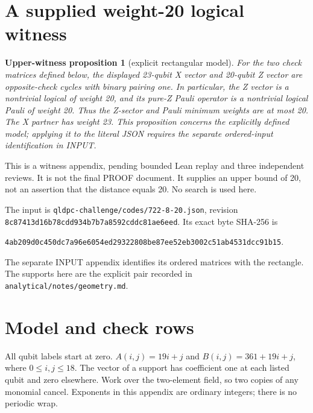 \documentclass{article}
\newtheorem*{upperwitness}{Upper-witness proposition}
\begin{document}
\section{A supplied weight-20 logical witness}\label{sec:witness}

\begin{upperwitness}[explicit rectangular model]
  For the two check matrices defined below, the displayed 23-qubit X vector and 20-qubit
  Z vector are opposite-check cycles with binary pairing one. In particular, the Z vector
  is a nontrivial logical of weight 20, and its pure-Z Pauli operator is a nontrivial
  logical Pauli of weight 20. Thus the Z-sector and Pauli minimum weights are at most 20.
  The X partner has weight 23. This proposition concerns the explicitly defined model;
  applying it to the literal JSON requires the separate ordered-input identification in
  INPUT.
\end{upperwitness}

This is a witness appendix, pending bounded Lean replay and three independent
reviews. It is not the final PROOF document. It supplies an upper bound of 20,
not an assertion that the distance equals 20. No search is used here.

\begin{sloppypar}
The input is \nolinkurl{qldpc-challenge/codes/722-8-20.json}, revision
\texttt{8c87413d16b78cdd934b7b7a8592cddc81ae6eed}. Its exact byte SHA-256 is
\end{sloppypar}
\begin{center}
  \texttt{4ab209d0c450dc7a96e6054ed29322808be87ee52eb3002c51ab4531dcc91b15}.
\end{center}
The separate INPUT appendix identifies its ordered matrices with the rectangle.
The supports here are the explicit pair recorded in \nolinkurl{analytical/notes/geometry.md}.

\section{Model and check rows}\label{sec:model}

All qubit labels start at zero. \(A(i,j) = 19i + j\) and \(B(i,j) = 361 + 19i + j\),
where \(0 \le i,j \le 18\). The vector of a support has coefficient one at each
listed qubit and zero elsewhere. Work over the two-element field, so two
copies of any monomial cancel. Exponents in this appendix are ordinary
integers; there is no periodic wrap.
\end{document}
